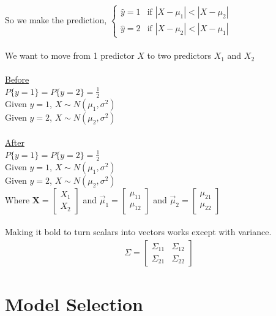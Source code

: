 \documentclass[12pt, letterpaper]{article}
\begin{document}
So we make the prediction, 
$\begin{cases}
    \hat y = 1 &\text{if }|X-\mu_1| < |X-\mu_2| \\
    \hat y = 2 &\text{if }|X-\mu_2| < |X-\mu_1|
\end{cases}$ \\ \\
We want to move from 1 predictor $X$ to two predictors $X_1$ and $X_2$\\ \\
\underline{Before} \\
$P\{y=1\} = P\{y=2\} = \frac 12$ \\
Given $y = 1$, $X \sim N(\mu_1, \sigma^2)$ \\ 
Given $y = 2$, $X \sim N(\mu_2, \sigma^2)$ \\ \\ 
\underline{After} \\
$P\{y=1\} = P\{y=2\} = \frac 12$ \\
Given $y = 1$, $X \sim N(\mu_1, \sigma^2)$ \\ 
Given $y = 2$, $X \sim N(\mu_2, \sigma^2)$ \\
Where $\mathbf{X} = \begin{bmatrix}
    X_1 \\ X_2
\end{bmatrix}$
and $\vec \mu_1 = \begin{bmatrix}
    \mu_{11} \\ \mu_{12}
\end{bmatrix}$
and $\vec \mu_2 = \begin{bmatrix}
    \mu_{21} \\ \mu_{22}
\end{bmatrix}$ \\ \\ 
Making it bold to turn scalars into vectors works except with variance.
\begin{align*}
    \Sigma = \begin{bmatrix}
        \Sigma_{11} & \Sigma_{12} \\
        \Sigma_{21} & \Sigma_{22}
    \end{bmatrix}
\end{align*}

\section{Model Selection}
\end{document}

